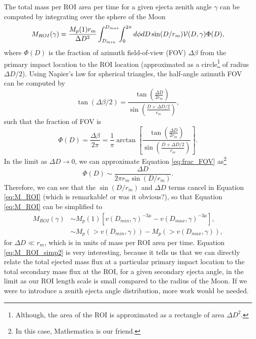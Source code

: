 \documentclass{hitec}
\numberwithin{equation}{section}
\begin{document}
The total mass per ROI area per time for a given ejecta zenith angle $\gamma$ can be computed by integrating over the sphere of the Moon
\begin{equation}\label{eq:M_ROI}
M_{ROI}(\gamma) = \frac{M_p(1)r_m}{\Delta D^2} \int_{D_{min}}^{D_{max}}\hspace{-0.1cm}\int_{0}^{2\pi}d\phi dD \sin(D/r_m) \mathcal{V}(D,\gamma)\Phi(D),
\end{equation}
where $\Phi(D)$ is the fraction of azimuth field-of-view (FOV) $\Delta\beta$ from the primary impact location to the ROI location (approximated as a circle\footnote{Although, the area of the ROI is approximated as a rectangle of area $\Delta D^2$.} of radius $\Delta D/2$). Using Napier's law for spherical triangles, the half-angle azimuth FOV can be computed by
\begin{equation}
\tan(\Delta\beta/2) = \frac{\tan\left(\frac{\Delta D}{2r_m}\right)}{\sin\left(\frac{D+\Delta D/2}{r_m}\right)},
\end{equation}
such that the fraction of FOV is
\begin{equation}\label{eq:frac_FOV}
\Phi(D) = \frac{\Delta\beta}{2\pi} = \frac{1}{\pi}\arctan\left[\frac{\tan\left(\frac{\Delta D}{2r_m}\right)}{\sin\left(\frac{D+\Delta D/2}{r_m}\right)}\right].
\end{equation}
In the limit as $\Delta D \to 0$, we can approximate Equation \eqref{eq:frac_FOV} as\footnote{In this case, Mathematica is our friend.}
\begin{equation}
\Phi(D) \sim \frac{\Delta D}{2\pi r_m\sin(D/r_m)}.
\end{equation}
Therefore, we can see that the $\sin(D/r_m)$ and $\Delta D$ terms cancel in Equation \eqref{eq:M_ROI} (which is remarkable! or was it obvious?), so that Equation \eqref{eq:M_ROI} can be simplified to
\begin{align}\label{eq:M_ROI_simp1}
M_{ROI}(\gamma) &\sim M_p(1)\left[v(D_{min},\gamma)^{-3\mu} - v(D_{max},\gamma)^{-3\mu}\right],\\\label{eq:M_ROI_simp2}
&\sim M_p(>v(D_{min},\gamma)) - M_p(>v(D_{max},\gamma)),
\end{align}
for $\Delta D \ll r_m$, which is in units of mass per ROI area per time.
Equation \eqref{eq:M_ROI_simp2} is very interesting, because it tells us that we can directly relate the total ejected mass flux at a particular primary impact location to the total secondary mass flux at the ROI, for a given secondary ejecta angle, in the limit as our ROI length scale is small compared to the radius of the Moon. If we were to introduce a zenith ejecta angle distribution, more work would be needed.
\end{document}
